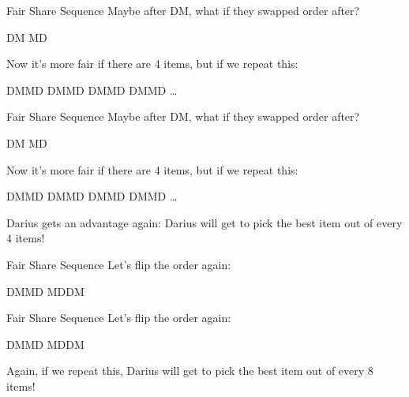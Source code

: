 \documentclass{beamer}
\begin{document}
\begin{frame}[t]{Fair Share Sequence}
    \vspace{30pt}
    Maybe after DM, what if they swapped order after?
    \begin{center}
        DM MD
    \end{center}

    \medskip
    
    Now it's more fair if there are 4 items, but if we repeat this:

    \begin{center}
        DMMD DMMD DMMD DMMD \dots
    \end{center}

\end{frame}

\begin{frame}[t]{Fair Share Sequence}
    \vspace{30pt}
    Maybe after DM, what if they swapped order after?
    \begin{center}
        DM MD
    \end{center}

    \medskip
    
    Now it's more fair if there are 4 items, but if we repeat this:

    \begin{center}
        DMMD DMMD DMMD DMMD \dots
    \end{center}

    \medskip

    Darius gets an advantage again: Darius will get to pick the best item out
    of every 4 items!


\end{frame}

\begin{frame}[t]{Fair Share Sequence}
    \vspace{30pt}
    Let's flip the order again:

    \begin{center}
        DMMD MDDM
    \end{center}

\end{frame}

\begin{frame}[t]{Fair Share Sequence}
    \vspace{30pt}
    Let's flip the order again:

    \begin{center}
        DMMD MDDM
    \end{center}

    \medskip
    
    Again, if we repeat this, Darius will get to pick the best item out of every 8 items!

\end{frame}
\end{document}
